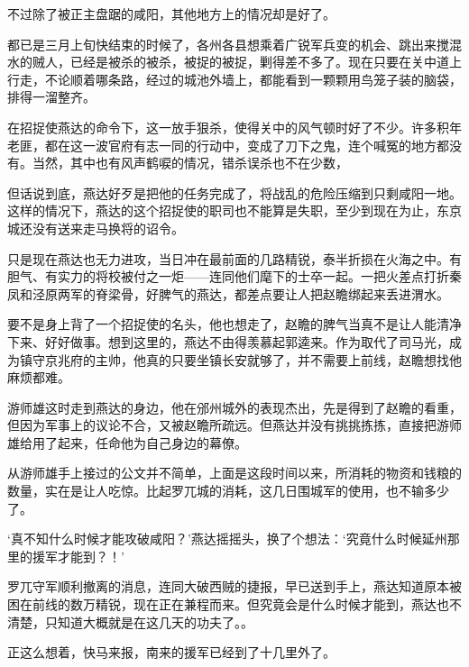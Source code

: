 不过除了被正主盘踞的咸阳，其他地方上的情况却是好了。

都已是三月上旬快结束的时候了，各州各县想乘着广锐军兵变的机会、跳出来搅混水的贼人，已经是被杀的被杀，被捉的被捉，剿得差不多了。现在只要在关中道上行走，不论顺着哪条路，经过的城池外墙上，都能看到一颗颗用鸟笼子装的脑袋，排得一溜整齐。

在招捉使燕达的命令下，这一放手狠杀，使得关中的风气顿时好了不少。许多积年老匪，都在这一波官府有志一同的行动中，变成了刀下之鬼，连个喊冤的地方都没有。当然，其中也有风声鹤唳的情况，错杀误杀也不在少数，

但话说到底，燕达好歹是把他的任务完成了，将战乱的危险压缩到只剩咸阳一地。这样的情况下，燕达的这个招捉使的职司也不能算是失职，至少到现在为止，东京城还没有送来走马换将的诏令。

只是现在燕达也无力进攻，当日冲在最前面的几路精锐，泰半折损在火海之中。有胆气、有实力的将校被付之一炬——连同他们麾下的士卒一起。一把火差点打折秦凤和泾原两军的脊梁骨，好脾气的燕达，都差点要让人把赵瞻绑起来丢进渭水。

要不是身上背了一个招捉使的名头，他也想走了，赵瞻的脾气当真不是让人能清净下来、好好做事。想到这里的，燕达不由得羡慕起郭逵来。作为取代了司马光，成为镇守京兆府的主帅，他真的只要坐镇长安就够了，并不需要上前线，赵瞻想找他麻烦都难。

游师雄这时走到燕达的身边，他在邠州城外的表现杰出，先是得到了赵瞻的看重，但因为军事上的议论不合，又被赵瞻所疏远。但燕达并没有挑挑拣拣，直接把游师雄给用了起来，任命他为自己身边的幕僚。

从游师雄手上接过的公文并不简单，上面是这段时间以来，所消耗的物资和钱粮的数量，实在是让人吃惊。比起罗兀城的消耗，这几日围城军的使用，也不输多少了。

‘真不知什么时候才能攻破咸阳？’燕达摇摇头，换了个想法：‘究竟什么时候延州那里的援军才能到？！’

罗兀守军顺利撤离的消息，连同大破西贼的捷报，早已送到手上，燕达知道原本被困在前线的数万精锐，现在正在兼程而来。但究竟会是什么时候才能到，燕达也不清楚，只知道大概就是在这几天的功夫了。。

正这么想着，快马来报，南来的援军已经到了十几里外了。

